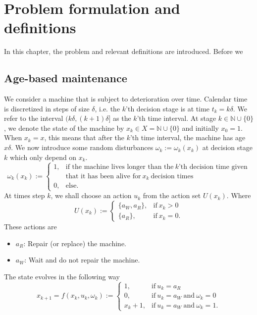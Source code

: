 \chapter{Problem formulation and definitions}
In this chapter, the problem and relevant definitions are introduced.
Before we 

\section{Age-based maintenance}
We consider a machine that is subject to deterioration over time.
Calendar time is discretized in steps of size $\delta$, i.e. the $k$'th decision stage is at time $t_k=k\delta$.
We refer to the interval $(k\delta,(k+1)\delta]$ as the $k$'th time interval.
At stage $k\in\mathbb{N}\cup\{0\}$, we denote the state of the machine by $x_k\in X=\mathbb{N}\cup\{0\}$ and initially $x_0=1$.
When $x_k=x$, this means that after the $k$'th time interval, the machine has age $x\delta$.
We now introduce some random disturbances $\omega_k:=\omega_k(x_k)$ at decision stage $k$ which only depend on $x_k$.
\begin{equation}
\omega_k(x_k):=\begin{cases}
1,&\text{if the machine lives longer than the}\ k\text{'th decision time given}\\
&\text{that it has been alive for}\ x_k\ \text{decision times} \\
0,&\text{else}.
\end{cases}
\end{equation}
At times step $k$, we shall choose an action $u_k$ from the action set $U(x_k)$.
Where
\begin{equation}
U(x_k):=\begin{cases}
\{a_W,a_R\},&\text{if}\ x_k>0 \\
\{a_R\},&\text{if}\ x_k=0.
\end{cases}
\end{equation}
These actions are
\begin{itemize}
	\item $a_R$:
	Repair (or replace) the machine.
	\item $a_W$:
	Wait and do not repair the machine.
\end{itemize}
The state evolves in the following way
\begin{equation}
x_{k+1}=f(x_k,u_k,\omega_k):=\begin{cases}
1,&\text{if}\ u_k=a_R \\
0,&\text{if}\ u_k=a_W\ \text{and}\ \omega_k=0 \\
x_k+1,&\text{if}\ u_k=a_W\ \text{and}\ \omega_k=1.
\end{cases}
\end{equation}
